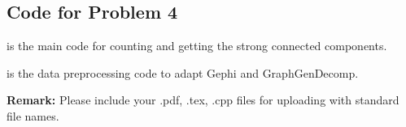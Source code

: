 \documentclass[12pt,a4paper]{article}
\theoremstyle{definition}
\begin{document}
\begin{appendix}
\section{Code for Problem 4}
 is the main code for counting and getting the strong connected components.
\begin{multicols}{2}

\end{multicols}
 is the data preprocessing code to adapt Gephi and GraphGenDecomp.
\begin{multicols}{2}

\end{multicols}
\end{appendix}

\textbf{Remark:} Please include your .pdf, .tex, .cpp files for uploading with standard file names.
\newpage


\end{document}
